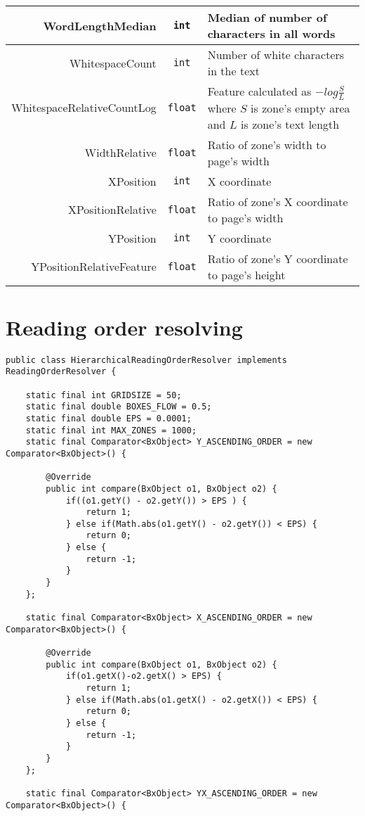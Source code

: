 \begin{appendix}
\begin{longtable}[c]{|r|c|p{8cm}|}
WordLengthMedian & \verb+int+ & Median of number of characters in all words \\ \hline
WhitespaceCount & \verb+int+ & Number of white characters in the text\\ \hline
WhitespaceRelativeCountLog & \verb+float+ & Feature calculated as $-log \frac{S}{L}$ where $S$ is zone's empty area and $L$ is zone's text length \\ \hline
WidthRelative & \verb+float+ & Ratio of zone's width to page's width\\ \hline
XPosition & \verb+int+ & X coordinate\\ \hline
XPositionRelative & \verb+float+ & Ratio of zone's X coordinate to page's width \\ \hline
YPosition & \verb+int+ & Y coordinate \\ \hline
YPositionRelativeFeature & \verb+float+ & Ratio of zone's Y coordinate to page's height \\ \hline
\end{longtable}

\chapter{Reading order resolving} \label{appendix:ror}
\begin{lstlisting}
public class HierarchicalReadingOrderResolver implements ReadingOrderResolver {

    static final int GRIDSIZE = 50;
    static final double BOXES_FLOW = 0.5;
    static final double EPS = 0.0001;
    static final int MAX_ZONES = 1000;
    static final Comparator<BxObject> Y_ASCENDING_ORDER = new Comparator<BxObject>() {

        @Override
        public int compare(BxObject o1, BxObject o2) {
        	if((o1.getY() - o2.getY()) > EPS ) {
        		return 1;
        	} else if(Math.abs(o1.getY() - o2.getY()) < EPS) {
        		return 0;
        	} else {
        		return -1;
        	}
        }
    };

    static final Comparator<BxObject> X_ASCENDING_ORDER = new Comparator<BxObject>() {

        @Override
        public int compare(BxObject o1, BxObject o2) {
        	if(o1.getX()-o2.getX() > EPS) {
        		return 1;
        	} else if(Math.abs(o1.getX() - o2.getX()) < EPS) {
        		return 0;
        	} else {
        		return -1;
        	}
        }
    };
    
    static final Comparator<BxObject> YX_ASCENDING_ORDER = new Comparator<BxObject>() {


\end{lstlisting}
\end{appendix}
